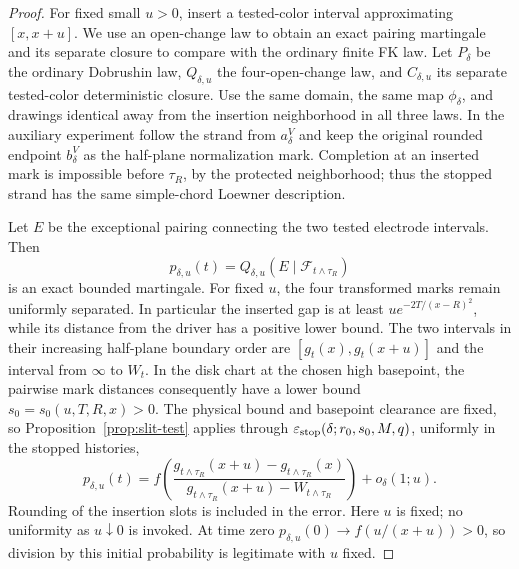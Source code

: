 \begin{proof}
For fixed small $u>0$, insert a tested-color interval approximating
$[x,x+u]$.  We use an open-change law to obtain an exact pairing
martingale and its separate closure to compare with the ordinary
finite FK law.  Let $P_\delta$ be the ordinary Dobrushin law,
$Q_{\delta,u}$ the four-open-change law, and $C_{\delta,u}$ its
separate tested-color deterministic closure.  Use the same domain,
the same map $\phi_\delta$, and drawings identical away from the
insertion neighborhood in all three laws.  In the auxiliary
experiment follow the strand from $a_\delta^V$ and keep the
original rounded endpoint $b_\delta^V$ as the half-plane
normalization mark.  Completion at an inserted mark
is impossible before $\tau_R$, by the protected neighborhood;
thus the stopped strand has the same simple-chord Loewner description.

Let $E$ be the exceptional pairing connecting the two tested
electrode intervals.  Then
\[
 p_{\delta,u}(t)
   =Q_{\delta,u}(E\mid\mathcal F_{t\wedge\tau_R})
\]
is an exact bounded martingale.  For fixed $u$, the four transformed
marks remain uniformly separated.  In particular the inserted gap
is at least $u e^{-2T/(x-R)^2}$, while its distance from the driver
has a positive lower bound.  The two intervals in their increasing
half-plane boundary order are
$[g_t(x),g_t(x+u)]$ and the interval from $\infty$ to $W_t$.
In the disk chart at the chosen high basepoint, the pairwise mark
distances consequently have a lower bound
$s_0=s_0(u,T,R,x)>0$.  The physical bound and basepoint clearance
are fixed, so Proposition~\ref{prop:slit-test} applies through
$\varepsilon_{\rm stop}(\delta;r_0,s_0,M,q)$, uniformly in the
stopped histories,
\begin{equation}\label{chordal:pairing-martingale}
 p_{\delta,u}(t)
 =f\left(
 \frac{g_{t\wedge\tau_R}(x+u)-g_{t\wedge\tau_R}(x)}
 {g_{t\wedge\tau_R}(x+u)-W_{t\wedge\tau_R}}
 \right)+o_\delta(1;u).
\end{equation}
Rounding of the insertion slots is included in the error.
Here $u$ is fixed; no uniformity as $u\downarrow0$ is invoked.
At time zero $p_{\delta,u}(0)\to f(u/(x+u))>0$, so division by
this initial probability is legitimate with $u$ fixed.


\end{proof}
